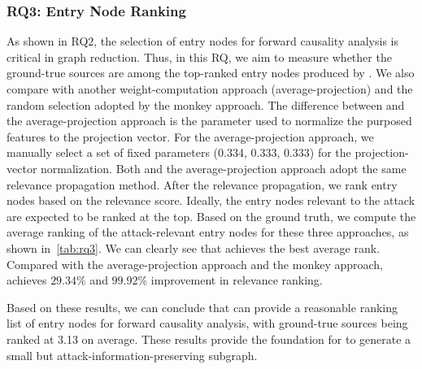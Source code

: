 
%


\subsubsection{RQ3: Entry Node Ranking}
\label{subsubsec:rq3}

As shown in RQ2, the selection of entry nodes for forward causality analysis is critical in graph reduction.
Thus, in this RQ, we aim to measure whether the ground-true sources are among the top-ranked entry nodes produced by \tool.
We also compare \tool with another weight-computation approach (average-projection) and the random selection adopted by the monkey approach.
The difference between \tool and the average-projection approach is the parameter used to normalize the purposed features to the projection vector. 
For the average-projection approach, we manually select a set of fixed parameters (0.334, 0.333, 0.333) for the projection-vector normalization. 
Both \tool and the average-projection approach adopt the same relevance propagation method. 
After the relevance propagation, we rank entry nodes based on the relevance score. 
Ideally, the entry nodes relevant to the attack are expected to be ranked at the top. Based on the ground truth, we compute the average ranking of the attack-relevant entry nodes for these three approaches, as shown in~\cref{tab:rq3}. 
We can clearly see that \tool achieves the best average rank. 
Compared with the average-projection approach and the monkey approach, \tool achieves $29.34\%$ and $99.92\%$ improvement in relevance ranking.

Based on these results, we can conclude that \tool can provide a reasonable ranking list of entry nodes for forward causality analysis, with ground-true sources being ranked at 3.13 on average. These results provide the foundation for \tool to generate a small but attack-information-preserving subgraph.

